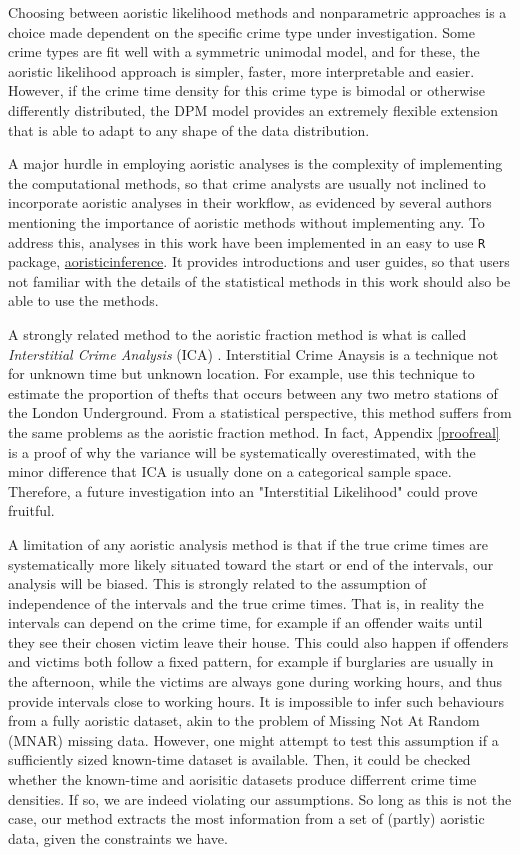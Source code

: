 Choosing between aoristic likelihood methods and nonparametric approaches is a choice made dependent on the specific crime type under investigation. Some crime types are fit well with a symmetric unimodal model, and for these, the aoristic likelihood approach is simpler, faster, more interpretable and easier. However, if the crime time density for this crime type is bimodal or otherwise differently distributed, the DPM model provides an extremely flexible extension that is able to adapt to any shape of the data distribution.

A major hurdle in employing aoristic analyses is the complexity of implementing the computational methods, so that crime analysts are usually not inclined to incorporate aoristic analyses in their workflow, as evidenced by several authors mentioning the importance of aoristic methods without implementing any. To address this, analyses in this work have been implemented in an easy to use \texttt{R} package, \href{https://github.com/keesmulder/aoristicinference}{aoristicinference}. It provides introductions and user guides, so that users not familiar with the details of the statistical methods in this work should also be able to use the methods.

A strongly related method to the aoristic fraction method is what is called \textit{Interstitial Crime Analysis} (ICA) \citep{gill2014interstitial}. Interstitial Crime Anaysis is a technique not for unknown time but unknown location. For example, \citet{newton2014above} use this technique to estimate the proportion of thefts that occurs between any two metro stations of the London Underground. From a statistical perspective, this method suffers from the same problems as the aoristic fraction method. In fact, Appendix \ref{proofreal} is a proof of why the variance will be systematically overestimated, with the minor difference that ICA is usually done on a categorical sample space. Therefore, a future investigation into an "Interstitial Likelihood" could prove fruitful.

A limitation of any aoristic analysis method is that if the true crime times are systematically more likely situated toward the start or end of the intervals, our analysis will be biased. This is strongly related to the assumption of independence of the intervals and the true crime times. That is, in reality the intervals can depend on the crime time, for example if an offender waits until they see their chosen victim leave their house. This could also happen if offenders and victims both follow a fixed pattern, for example if burglaries are usually in the afternoon, while the victims are always gone during working hours, and thus provide intervals close to working hours. It is impossible to infer such behaviours from a fully aoristic dataset, akin to the problem of Missing Not At Random (MNAR) missing data. However, one might attempt to test this assumption if a sufficiently sized known-time dataset is available. Then, it could be checked whether the known-time and aorisitic datasets produce differrent crime time densities. If so, we are indeed violating our assumptions. So long as this is not the case, our method extracts the most information from a set of (partly) aoristic data, given the constraints we have.

